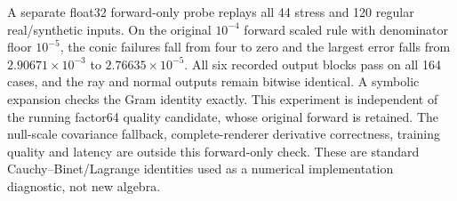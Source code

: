 \documentclass[11pt,a4paper]{article}
\begin{document}
A separate float32 forward-only probe replays all 44 stress and 120
regular real/synthetic inputs. On the original $10^{-4}$ forward
scaled rule with denominator floor $10^{-5}$, the conic failures
fall from four to zero and the largest error falls from
$2.90671\times10^{-3}$ to $2.76635\times10^{-5}$.
All six recorded output blocks pass on all 164 cases, and the ray
and normal outputs remain bitwise identical. A symbolic expansion
checks the Gram identity exactly. This experiment is independent of
the running factor64 quality candidate, whose original forward is
retained. The null-scale covariance fallback, complete-renderer
derivative correctness, training quality and latency are outside
this forward-only check. These are standard Cauchy--Binet/Lagrange
identities used as a numerical implementation diagnostic, not new
algebra.
\end{document}
